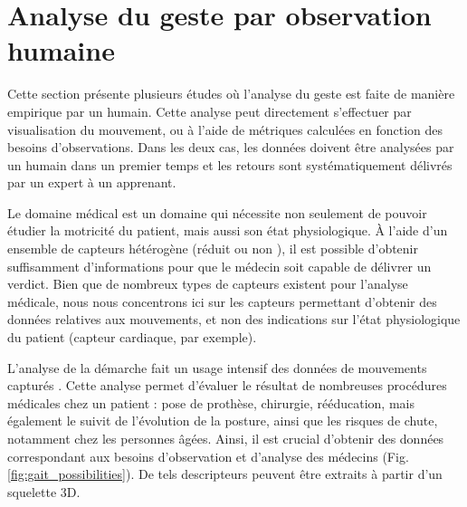 \section{Analyse du geste par observation humaine}
Cette section présente plusieurs études où l'analyse du geste est faite de manière empirique par un humain. Cette analyse peut directement s'effectuer par visualisation du mouvement, ou à l'aide de métriques calculées en fonction des besoins d'observations. Dans les deux cas, les données doivent être analysées par un humain dans un premier temps et les retours sont systématiquement délivrés par un expert à un apprenant.

Le domaine médical est un domaine qui nécessite non seulement de pouvoir étudier la motricité du patient, mais aussi son état physiologique. À l'aide d'un ensemble de capteurs hétérogène (réduit \parencite{Alankus2010TCG} ou non \parencite{deVries2006Cro}), il est possible d'obtenir suffisamment d'informations pour que le médecin soit capable de délivrer un verdict. Bien que de nombreux types de capteurs existent pour l'analyse médicale, nous nous concentrons ici sur les capteurs permettant d'obtenir des données relatives aux mouvements, et non des indications sur l'état physiologique du patient (capteur cardiaque, par exemple).

L'analyse de la démarche fait un usage intensif des données de mouvements capturés \parencite{Chen2016TPG}. Cette analyse permet d'évaluer le résultat de nombreuses procédures médicales chez un patient : pose de prothèse, chirurgie, rééducation, mais également le suivit de l'évolution de la posture, ainsi que les risques de chute, notamment chez les personnes âgées. Ainsi, il est crucial d'obtenir des données correspondant aux besoins d'observation et d'analyse des médecins (Fig. \ref{fig:gait_possibilities}). De tels descripteurs peuvent être extraits à partir d'un squelette 3D.

